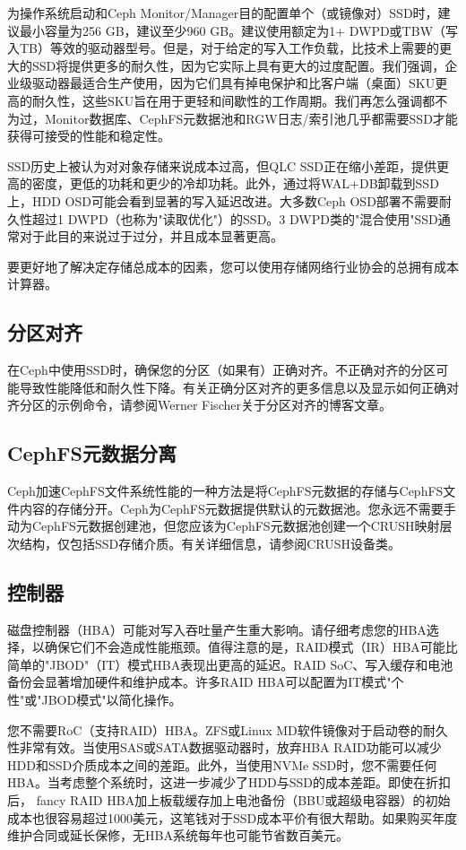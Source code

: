 \documentclass[12pt,UTF8]{ctexbook}
\begin{document}
为操作系统启动和Ceph Monitor/Manager目的配置单个（或镜像对）SSD时，建议最小容量为256 GB，建议至少960 GB。建议使用额定为1+ DWPD或TBW（写入TB）等效的驱动器型号。但是，对于给定的写入工作负载，比技术上需要的更大的SSD将提供更多的耐久性，因为它实际上具有更大的过度配置。我们强调，企业级驱动器最适合生产使用，因为它们具有掉电保护和比客户端（桌面）SKU更高的耐久性，这些SKU旨在用于更轻和间歇性的工作周期。我们再怎么强调都不为过，Monitor数据库、CephFS元数据池和RGW日志/索引池几乎都需要SSD才能获得可接受的性能和稳定性。

SSD历史上被认为对对象存储来说成本过高，但QLC SSD正在缩小差距，提供更高的密度，更低的功耗和更少的冷却功耗。此外，通过将WAL+DB卸载到SSD上，HDD OSD可能会看到显著的写入延迟改进。大多数Ceph OSD部署不需要耐久性超过1 DWPD（也称为"读取优化"）的SSD。3 DWPD类的"混合使用"SSD通常对于此目的来说过于过分，并且成本显著更高。

要更好地了解决定存储总成本的因素，您可以使用存储网络行业协会的总拥有成本计算器。

\subsection{分区对齐}
在Ceph中使用SSD时，确保您的分区（如果有）正确对齐。不正确对齐的分区可能导致性能降低和耐久性下降。有关正确分区对齐的更多信息以及显示如何正确对齐分区的示例命令，请参阅Werner Fischer关于分区对齐的博客文章。

\subsection{CephFS元数据分离}
Ceph加速CephFS文件系统性能的一种方法是将CephFS元数据的存储与CephFS文件内容的存储分开。Ceph为CephFS元数据提供默认的元数据池。您永远不需要手动为CephFS元数据创建池，但您应该为CephFS元数据池创建一个CRUSH映射层次结构，仅包括SSD存储介质。有关详细信息，请参阅CRUSH设备类。

\subsection{控制器}
磁盘控制器（HBA）可能对写入吞吐量产生重大影响。请仔细考虑您的HBA选择，以确保它们不会造成性能瓶颈。值得注意的是，RAID模式（IR）HBA可能比简单的"JBOD"（IT）模式HBA表现出更高的延迟。RAID SoC、写入缓存和电池备份会显著增加硬件和维护成本。许多RAID HBA可以配置为IT模式"个性"或"JBOD模式"以简化操作。

您不需要RoC（支持RAID）HBA。ZFS或Linux MD软件镜像对于启动卷的耐久性非常有效。当使用SAS或SATA数据驱动器时，放弃HBA RAID功能可以减少HDD和SSD介质成本之间的差距。此外，当使用NVMe SSD时，您不需要任何HBA。当考虑整个系统时，这进一步减少了HDD与SSD的成本差距。即使在折扣后， fancy RAID HBA加上板载缓存加上电池备份（BBU或超级电容器）的初始成本也很容易超过1000美元，这笔钱对于SSD成本平价有很大帮助。如果购买年度维护合同或延长保修，无HBA系统每年也可能节省数百美元。
\end{document}

